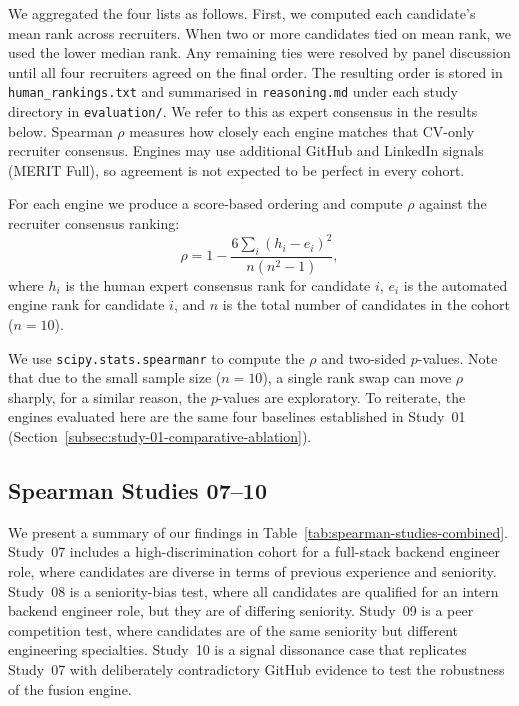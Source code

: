 We aggregated the four lists as follows.
First, we computed each candidate's mean rank across recruiters.
When two or more candidates tied on mean rank, we used the lower median rank.
Any remaining ties were resolved by panel discussion until all four recruiters agreed on the final order.
The resulting order is stored in \texttt{human\_rankings.txt} and summarised in \texttt{reasoning.md} under each 
study directory in \texttt{evaluation/}.
We refer to this as expert consensus in the results below.
Spearman $\rho$ measures how closely each engine matches that CV-only recruiter consensus.
Engines may use additional GitHub and LinkedIn signals (MERIT Full), so agreement is not expected to be perfect in every cohort.

For each engine we produce a score-based ordering and compute $\rho$ against the recruiter consensus ranking:
\begin{equation}
    \rho = 1 - \frac{6 \sum_i (h_i - e_i)^2}{n(n^2 - 1)} ,
\end{equation}
where $h_i$ is the human expert consensus rank for candidate $i$, $e_i$ is the automated engine rank for candidate $i$, and $n$ is the total number of candidates in the cohort ($n=10$).

We use \texttt{scipy.stats.spearmanr} to compute the $\rho$ and two-sided $p$-values. Note that due to the small sample size
($n=10$), a single rank swap can move $\rho$ sharply, for a similar reason, the $p$-values are exploratory. To reiterate, the engines evaluated here are the same four baselines established in Study~01 (Section~\ref{subsec:study-01-comparative-ablation}).

\subsection{Spearman Studies 07--10}
\label{subsec:study-07-spearman-high-discrimination}

We present a summary of our findings in Table~\ref{tab:spearman-studies-combined}.
Study~07 includes a high-discrimination cohort for a full-stack backend engineer role, where candidates are diverse in 
terms of previous experience and seniority. Study~08 is a seniority-bias test, where all candidates are qualified for an 
intern backend engineer role, but they are of differing seniority. Study~09 is a peer competition test, where
candidates are of the same seniority but different engineering specialties. Study~10 is a signal dissonance case that replicates Study~07 with
deliberately contradictory GitHub evidence to test the robustness of the fusion engine.

